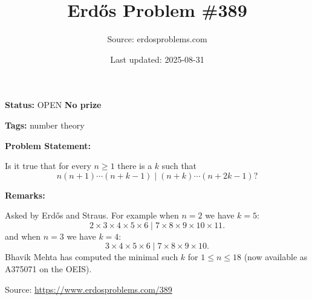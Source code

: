 \documentclass{article}
\title{Erd\H{o}s Problem \#389}
\date{Last updated: 2025-08-31}
\author{Source: erdosproblems.com}
\begin{document}
\maketitle

\noindent\textbf{Status:} OPEN \quad \textbf{No prize}

\noindent\textbf{Tags:} number theory

\medskip
\noindent\textbf{Problem Statement:}

Is it true that for every $n\geq 1$ there is a $k$ such that\[n(n+1)\cdots(n+k-1)\mid (n+k)\cdots (n+2k-1)?\]

\bigskip
\noindent\textbf{Remarks:}

Asked by Erd\H{o}s and Straus. 
For example when $n=2$ we have $k=5$:\[2\times 3 \times 4 \times 5\times 6 \mid 7 \times 8 \times 9\times 10\times 11.\]and when $n=3$ we have $k=4$:\[3\times 4\times 5\times 6 \mid 7\times 8\times 9\times 10.\]Bhavik Mehta has computed the minimal such $k$ for $1\leq n\leq 18$ (now available as A375071 on the OEIS).

\bigskip
\noindent\small{Source: \url{https://www.erdosproblems.com/389}}
\end{document}
